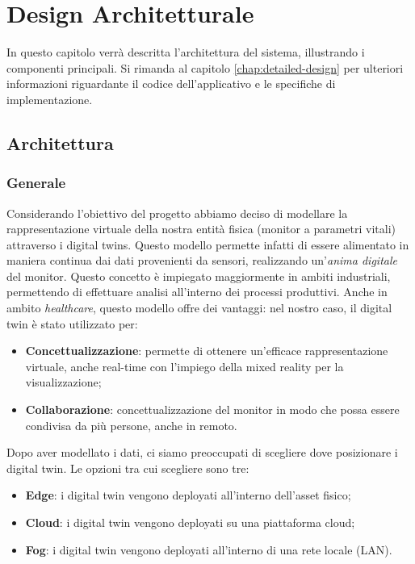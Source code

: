 \chapter{Design Architetturale}
\label{chap:architectural-design}
In questo capitolo verrà descritta l'architettura del sistema, illustrando i componenti principali. Si rimanda al capitolo \ref{chap:detailed-design} per ulteriori informazioni riguardante il codice dell'applicativo e le specifiche di implementazione.

\section{Architettura}

\subsection{Generale}

Considerando l'obiettivo del progetto abbiamo deciso di modellare la rappresentazione virtuale della nostra entità fisica (monitor a parametri vitali) attraverso i digital twins. Questo modello permette infatti di essere alimentato in maniera continua dai dati provenienti da sensori, realizzando un'\textit{anima digitale} del monitor. Questo concetto è impiegato maggiormente in ambiti industriali, permettendo di effettuare analisi all'interno dei processi produttivi. Anche in ambito \textit{healthcare}, questo modello offre dei vantaggi: nel nostro caso, il digital twin è stato utilizzato per:

\begin{itemize}
    \item \textbf{Concettualizzazione}: permette di ottenere un'efficace rappresentazione virtuale, anche real-time con l'impiego della mixed reality per la visualizzazione;

    \item \textbf{Collaborazione}: concettualizzazione del monitor in modo che possa essere condivisa da più persone, anche in remoto.
\end{itemize}

Dopo aver modellato i dati, ci siamo preoccupati di scegliere dove posizionare i digital twin. Le opzioni tra cui scegliere sono tre: 

\begin{itemize}
    \item \textbf{Edge}: i digital twin vengono deployati all'interno dell'asset fisico;
    
    \item \textbf{Cloud}: i digital twin vengono deployati su una piattaforma cloud;
    
    \item \textbf{Fog}: i digital twin vengono deployati all'interno di una rete locale (LAN).
\end{itemize}

